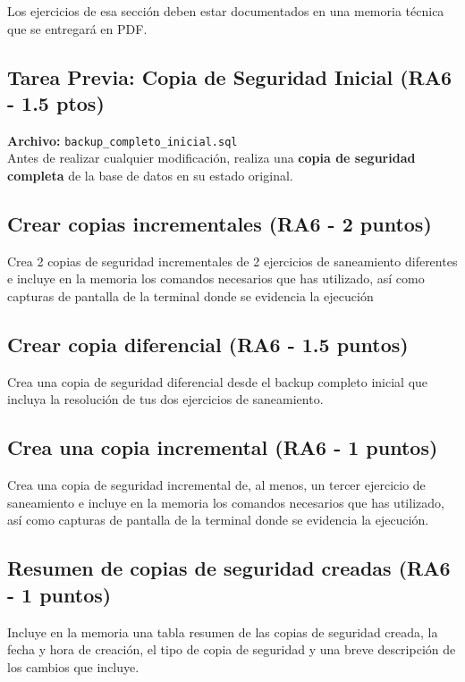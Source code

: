 \documentclass[12pt,a4paper]{article}
\begin{document}
Los ejercicios de esa sección deben estar documentados en una memoria técnica que se entregará en PDF.


\subsection{Tarea Previa: Copia de Seguridad Inicial \textcolor{RA6}{(RA6 - 1.5 ptos)}}
\textbf{Archivo:} \texttt{backup\_completo\_inicial.sql} \\
Antes de realizar cualquier modificación, realiza una \textbf{copia de seguridad completa} de la base de datos en su estado original. 

\subsection{Crear copias incrementales \textcolor{RA6}{(RA6 - 2 puntos)}}
Crea 2 copias de seguridad incrementales de 2 ejercicios de saneamiento diferentes e incluye en la memoria los comandos necesarios que has utilizado, así como capturas de pantalla de la terminal donde se evidencia la ejecución 

\subsection{Crear copia diferencial \textcolor{RA6}{(RA6 - 1.5 puntos)}}
Crea una copia de seguridad diferencial desde el backup completo inicial que incluya la resolución de tus dos ejercicios de saneamiento.

\subsection{Crea una copia incremental \textcolor{RA6}{(RA6 - 1 puntos)}}
Crea una copia de seguridad incremental de, al menos, un tercer ejercicio de saneamiento e incluye en la memoria los comandos necesarios que has utilizado, así como capturas de pantalla de la terminal donde se evidencia la ejecución.


\subsection{Resumen de copias de seguridad creadas \textcolor{RA6}{(RA6 - 1 puntos)}}
Incluye en la memoria una tabla resumen de las copias de seguridad creada, la fecha y hora de creación, el tipo de copia de seguridad y una breve descripción de los cambios que incluye.
\end{document}
